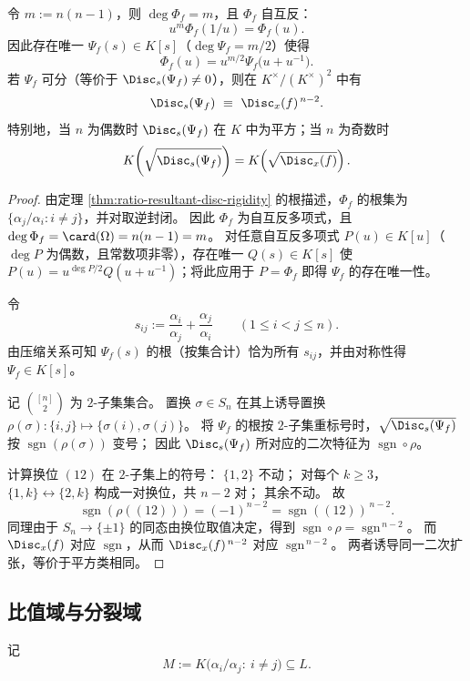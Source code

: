 \begin{theorem}\label{thm:ratio-resultant-chebyshev-parity}
令 \(m:=n(n-1)\)，则 \(\deg\Phi_f=m\)，且 \(\Phi_f\) 自互反：
\[
u^{m}\Phi_f(1/u)=\Phi_f(u).
\]
因此存在唯一 \(\Psi_f(s)\in K[s]\)（\(\deg \Psi_f=m/2\)）使得
\[
\Phi_f(u)=u^{m/2}\Psi_f\!\bigl(u+u^{-1}\bigr).
\]
若 \(\Psi_f\) 可分（等价于 \(\Disc_s(\Psi_f)\neq 0\)），则在 \(K^{\times}/(K^{\times})^{2}\) 中有
\[
\Disc_s(\Psi_f)\ \equiv\ \Disc_x(f)^{\,n-2}.
\]
特别地，当 \(n\) 为偶数时 \(\Disc_s(\Psi_f)\) 在 \(K\) 中为平方；当 \(n\) 为奇数时
\[
K\!\left(\sqrt{\Disc_s(\Psi_f)}\right)=K\!\left(\sqrt{\Disc_x(f)}\right).
\]
\end{theorem}
\begin{proof}
由定理 \ref{thm:ratio-resultant-disc-rigidity} 的根描述，\(\Phi_f\) 的根集为 \(\{\alpha_j/\alpha_i:i\neq j\}\)，并对取逆封闭。
因此 \(\Phi_f\) 为自互反多项式，且 \(\deg\Phi_f=\card(\Omega)=n(n-1)=m\)。
对任意自互反多项式 \(P(u)\in K[u]\)（\(\deg P\) 为偶数，且常数项非零），存在唯一 \(Q(s)\in K[s]\) 使 \(P(u)=u^{\deg P/2}Q(u+u^{-1})\)；将此应用于 \(P=\Phi_f\) 即得 \(\Psi_f\) 的存在唯一性。

令
\[
s_{ij}:=\frac{\alpha_i}{\alpha_j}+\frac{\alpha_j}{\alpha_i}\qquad (1\le i<j\le n).
\]
由压缩关系可知 \(\Psi_f(s)\) 的根（按集合计）恰为所有 \(s_{ij}\)，并由对称性得 \(\Psi_f\in K[s]\)。

记 \(\binom{[n]}{2}\) 为 \(2\)-子集集合。
置换 \(\sigma\in S_n\) 在其上诱导置换 \(\rho(\sigma):\{i,j\}\mapsto\{\sigma(i),\sigma(j)\}\)。
将 \(\Psi_f\) 的根按 \(2\)-子集重标号时，\(\sqrt{\Disc_s(\Psi_f)}\) 按 \(\operatorname{sgn}(\rho(\sigma))\) 变号；
因此 \(\Disc_s(\Psi_f)\) 所对应的二次特征为 \(\operatorname{sgn}\circ\rho\)。

计算换位 \((12)\) 在 \(2\)-子集上的符号：
\(\{1,2\}\) 不动；
对每个 \(k\ge 3\)，\(\{1,k\}\leftrightarrow\{2,k\}\) 构成一对换位，共 \(n-2\) 对；
其余不动。
故
\[
 \operatorname{sgn}(\rho((12)))=(-1)^{n-2}=\operatorname{sgn}((12))^{\,n-2}.
\]
同理由于 \(S_n\to\{\pm1\}\) 的同态由换位取值决定，得到
\(
 \operatorname{sgn}\circ\rho=\operatorname{sgn}^{\,n-2}
\)。
而 \(\Disc_x(f)\) 对应 \(\operatorname{sgn}\)，从而 \(\Disc_x(f)^{\,n-2}\) 对应 \(\operatorname{sgn}^{\,n-2}\)。
两者诱导同一二次扩张，等价于平方类相同。
\end{proof}

\subsection{比值域与分裂域}
记
\[
M:=K\bigl(\alpha_i/\alpha_j:\ i\neq j\bigr)\subseteq L.
\]


